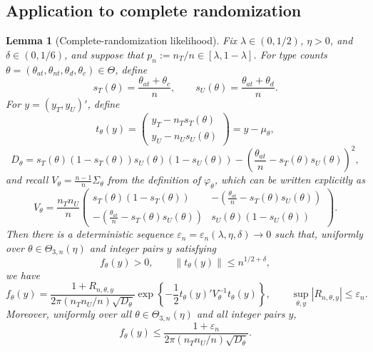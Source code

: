 \documentclass[12pt,reqno]{amsart}
\theoremstyle{theorem}
\newtheorem{lem}{Lemma}[section]
\theoremstyle{definition}
\newcommand{\0}{\mathbf{0}}
\newcommand{\1}{\mathbf{1}}
\begin{document}
\subsection{Application to complete randomization}
\label{sec:application}

\begin{lem}[Complete-randomization likelihood]\label{lem:ftheta-ratio}
Fix \(\lambda\in(0,1/2)\), \(\eta>0\), and \(\delta\in(0,1/6)\), and suppose that
\(p_n:=n_T/n\in[\lambda,1-\lambda]\).  For type counts
\(\theta=(\theta_{at},\theta_{nt},\theta_d,\theta_c) \in \Theta\),
define
\[
s_T(\theta)=\frac{\theta_{at}+\theta_c}{n},
\qquad
s_U(\theta)=\frac{\theta_{at}+\theta_d}{n}.
\]
For \(y=(y_T,y_U)'\), define
\[
t_\theta(y)=
\begin{pmatrix}
y_T-n_Ts_T(\theta)\\
y_U-n_Us_U(\theta)
\end{pmatrix}
= y - \mu_\theta,
\]
\[
D_\theta
=s_T(\theta)(1-s_T(\theta))s_U(\theta)(1-s_U(\theta))
-\left(\frac{\theta_{at}}n-s_T(\theta)s_U(\theta)\right)^2,
\]
and recall \(V_\theta = \tfrac{n-1}{n}\Sigma_\theta\) from the definition of \(\varphi_\theta\), which can be written explicitly as
\[
V_\theta
=
\frac{n_Tn_U}{n}
\begin{pmatrix}
s_T(\theta)(1-s_T(\theta))
& -\left(\frac{\theta_{at}}n-s_T(\theta)s_U(\theta)\right)\\
-\left(\frac{\theta_{at}}n-s_T(\theta)s_U(\theta)\right)
& s_U(\theta)(1-s_U(\theta))
\end{pmatrix}.
\]
Then there is a deterministic sequence
\(\varepsilon_n=\varepsilon_n(\lambda,\eta,\delta)\to0\) such that, uniformly
over \(\theta\in\Theta_{3,n}(\eta)\) and integer pairs \(y\) satisfying
\[
f_\theta(y)>0,\qquad \|t_\theta(y)\|\le n^{1/2+\delta},
\]
we have
\[
f_\theta(y)
=
\frac{1+R_{n,\theta,y}}
{2\pi (n_Tn_U/n)\sqrt{D_\theta}}
\exp\left\{-\frac12t_\theta(y)'V_\theta^{-1}t_\theta(y)\right\},
\qquad
\sup_{\theta,y}|R_{n,\theta,y}|\le\varepsilon_n.
\]
Moreover, uniformly over all \(\theta\in\Theta_{3,n}(\eta)\) and all integer
pairs \(y\),
\[
f_\theta(y)
\le
\frac{1+\varepsilon_n}
{2\pi (n_Tn_U/n)\sqrt{D_\theta}}.
\]
\end{lem}
\end{document}
